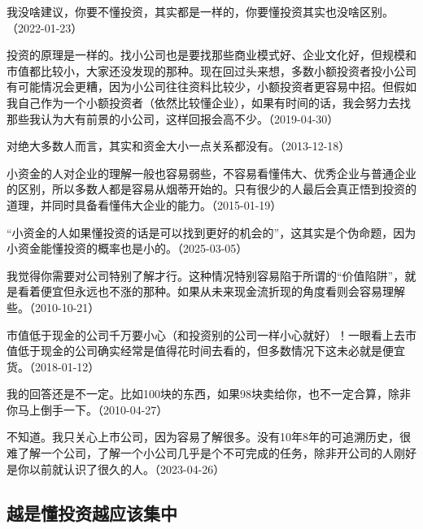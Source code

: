 
我没啥建议，你要不懂投资，其实都是一样的，你要懂投资其实也没啥区别。（2022-01-23）

投资的原理是一样的。找小公司也是要找那些商业模式好、企业文化好，但规模和市值都比较小，大家还没发现的那种。现在回过头来想，多数小额投资者投小公司有可能情况会更糟，因为小公司往往资料比较少，小额投资者更容易中招。但假如我自己作为一个小额投资者（依然比较懂企业），如果有时间的话，我会努力去找那些我认为大有前景的小公司，这样回报会高不少。（2019-04-30）


对绝大多数人而言，其实和资金大小一点关系都没有。（2013-12-18）

小资金的人对企业的理解一般也容易弱些，不容易看懂伟大、优秀企业与普通企业的区别，所以多数人都是容易从烟蒂开始的。只有很少的人最后会真正悟到投资的道理，并同时具备看懂伟大企业的能力。（2015-01-19）

“小资金的人如果懂投资的话是可以找到更好的机会的”，这其实是个伪命题，因为小资金能懂投资的概率也是小的。（2025-03-05）


我觉得你需要对公司特别了解才行。这种情况特别容易陷于所谓的“价值陷阱”，就是看着便宜但永远也不涨的那种。如果从未来现金流折现的角度看则会容易理解些。（2010-10-21）

市值低于现金的公司千万要小心（和投资别的公司一样小心就好）！一眼看上去市值低于现金的公司确实经常是值得花时间去看的，但多数情况下这未必就是便宜货。（2018-01-12）


我的回答还是不一定。比如100块的东西，如果98块卖给你，也不一定合算，除非你马上倒手一下。（2010-04-27）


不知道。我只关心上市公司，因为容易了解很多。没有10年8年的可追溯历史，很难了解一个公司，了解一个小公司几乎是个不可完成的任务，除非开公司的人刚好是你以前就认识了很久的人。（2023-04-26）

\subsection{越是懂投资越应该集中}

